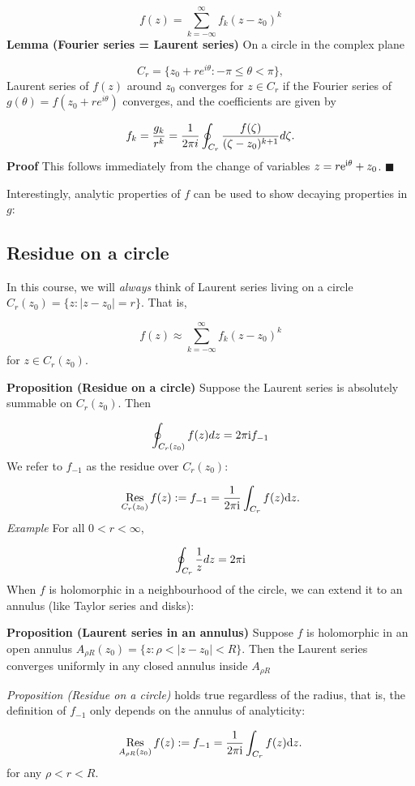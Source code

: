\documentclass[12pt,a4paper]{article}
\def\D{ {\rm d} }
\def\I{ {\rm i} }
\def\E{ {\rm e} }
\def\Res_#1{\underset{#1}{\rm Res}\,}
\begin{document}
\[
    f(z) = \sum_{k=-\infty}^\infty f_k (z-z_0)^k 
\]
\textbf{Lemma (Fourier series = Laurent series)} On a circle in the complex plane 

\[
    C_r = \{z_0 + re^{i \theta} : -\pi \leq \theta < \pi \},
\]
Laurent series of $f(z)$ around $z_0$ converges for $z \in C_r$ if the Fourier series of $g(\theta) = f(z_0 + r e^{i \theta})$ converges, and the coefficients are given by

\[
f_k = {g_k \over r^k} = {1 \over 2 \pi i} \oint_{C_r} {f(\zeta) \over (\zeta - z_0)^{k+1}} d \zeta.
\]
\textbf{Proof}  This follows immediately from the change of variables $z = r \E^{\I \theta} + z_0$. \ensuremath{\blacksquare}

Interestingly, analytic properties of $f$ can be used to show decaying properties in $g$:

\subsection{Residue on a circle}
In this course, we will \emph{always} think of Laurent series living on a circle  $C_r(z_0) = \{z : |z-z_0| = r \}$.  That is,

\[
    f(z) \approx \sum_{k=-\infty}^\infty f_k (z-z_0)^k
\]
for $z \in C_r(z_0)$.  

\textbf{Proposition (Residue on a circle)}  Suppose the Laurent series is absolutely summable on $C_r(z_0)$. Then 

\[
\oint_{C_r(z_0)} f(z) dz = 2 \pi \I f_{-1}
\]
We refer to $f_{-1}$ as the residue over $C_r(z_0)$:

\[
\Res_{C_r(z_0)} f(z) := f_{-1} = {1 \over 2 \pi \I} \int_{C_r} f(z) \D z. 
\]
\emph{Example} For all $0 < r < \infty$, 

\[
\oint_{C_r} {1 \over z} dz = 2 \pi \I
\]
When $f$ is holomorphic in a neighbourhood of the circle, we can extend it to an annulus  (like Taylor series and disks):

\textbf{Proposition (Laurent series in an annulus)} Suppose $f$ is holomorphic in an open annulus $A_{\rho R}(z_0) = \{z : \rho  < | z - z_0| < R\}$.  Then the Laurent series converges uniformly in  any closed annulus inside $A_{\rho R}$

\emph{Proposition (Residue on a circle)} holds true regardless of the radius, that is, the  definition of $f_{-1}$ only depends on the annulus of analyticity:

\[
\Res_{A_{\rho R}(z_0)} f(z) := f_{-1} = {1 \over 2 \pi \I} \int_{C_r} f(z) \D z. 
\]
for any $\rho < r < R$. 
\end{document}
